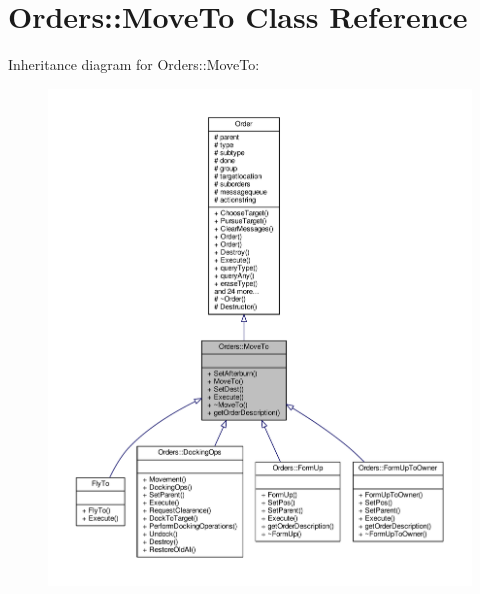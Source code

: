 \hypertarget{classOrders_1_1MoveTo}{}\section{Orders\+:\+:Move\+To Class Reference}
\label{classOrders_1_1MoveTo}


Inheritance diagram for Orders\+:\+:Move\+To\+:
\nopagebreak
\begin{figure}[H]
\begin{center}
\leavevmode
\includegraphics[width=350pt]{d2/d66/classOrders_1_1MoveTo__inherit__graph}
\end{center}
\end{figure}



